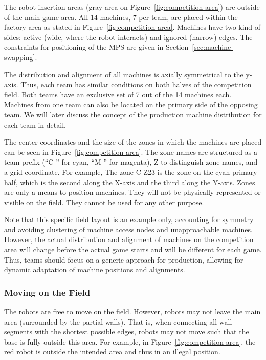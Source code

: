 \documentclass[12pt,twoside]{article}
\newcommand{\refsec}[1]{Section~\ref{#1}}
\newcommand{\reffig}[1]{Figure~\ref{#1}}
\begin{document}
The robot insertion areas (gray area on \reffig{fig:competition-area})
are outside of the main game area. All 14 machines, 7 per team, are
placed within the factory area as stated in
\reffig{fig:competition-area}. Machines have two kind of sides: active
(wide, where the robot interacts) and ignored (narrow) edges.  The
constraints for positioning of the MPS are given in
\refsec{sec:machine-swapping}.

The distribution and alignment of all machines is axially symmetrical
to the y-axis. Thus, each team has similar conditions on both halves of
the competition field. Both teams have an exclusive set of 7 out of
the 14 machines each. Machines from one team can also be located on the
primary side of the opposing team. We will later discuss the concept
of the production machine distribution for each team in detail.

The center coordinates and the size of the zones in which the machines
are placed can be seen in \reffig{fig:competition-area}. The zone
names are structured as a team prefix (``C-'' for cyan, ``M-'' for
magenta), Z to distinguish zone names, and a grid coordinate. For
example, The zone C-Z23 is the zone on the cyan primary half, which is
the second along the X-axis and the third along the Y-axis. Zones are
only a means to position machines. They will not be physically
represented or visible on the field. They cannot be used for any other
purpose.

Note that this specific field layout is an example only, accounting
for symmetry and avoiding clustering of machine access nodes and
unapproachable machines. However, the actual distribution and
alignment of machines on the competition area will change before the
actual game starts and will be different for each game. Thus, teams
should focus on a generic approach for production, allowing for
dynamic adaptation of machine positions and alignments.

\subsubsection{Moving on the Field}
\label{sec:field-movement}
The robots are free to move on the field. However, robots may not
leave the main area (surrounded by the partial walls). That is, when
connecting all wall segments with the shortest possible edges, robots
may not move such that the base is fully outside this area. For
example, in \reffig{fig:competition-area}, the red robot is outside
the intended area and thus in an illegal position.
\end{document}
